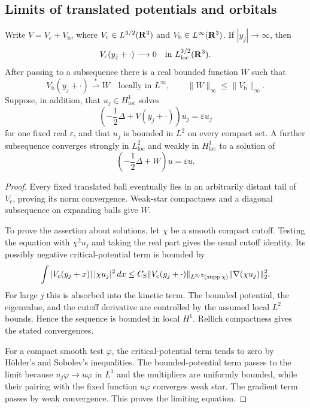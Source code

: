 \subsection{Limits of translated potentials and orbitals}

\begin{lemma}
\label{lem:translated-orbital-compactness}
Write \(V=V_{\mathrm c}+V_{\mathrm b}\), where
\(V_{\mathrm c}\in L^{3/2}(\mathbf R^3)\) and
\(V_{\mathrm b}\in L^\infty(\mathbf R^3)\).  If \(|y_j|\to\infty\), then
\[
 V_{\mathrm c}(y_j+\cdot)\longrightarrow0
 \quad\text{in }L^{3/2}_{\mathrm{loc}}(\mathbf R^3).
\]
After passing to a subsequence there is a real bounded function \(W\) such
that
\[
 V_{\mathrm b}(y_j+\cdot)\stackrel{*}{\rightharpoonup}W
 \quad\text{locally in }L^\infty,
 \qquad \|W\|_\infty\le\|V_{\mathrm b}\|_\infty.
\]
Suppose, in addition, that \(u_j\in H^1_{\mathrm{loc}}\) solves
\[
 \left(-\frac12\Delta+V(y_j+\cdot)\right)u_j=\varepsilon u_j
\]
for one fixed real \(\varepsilon\), and that \(u_j\) is bounded in
\(L^2\) on every compact set.  A further subsequence converges strongly
in \(L^2_{\mathrm{loc}}\) and weakly in \(H^1_{\mathrm{loc}}\) to a
solution of
\[
 \left(-\frac12\Delta+W\right)u=\varepsilon u.
\]
\end{lemma}

\begin{proof}
Every fixed translated ball eventually lies in an arbitrarily distant
tail of \(V_{\mathrm c}\), proving its norm convergence.  Weak-star
compactness and a diagonal subsequence on expanding balls give \(W\).

To prove the assertion about solutions, let \(\chi\) be a smooth compact
cutoff.  Testing the equation with \(\chi^2u_j\) and taking the real part
gives the usual cutoff identity.  Its possibly negative critical-potential
term is bounded by
\[
 \int |V_{\mathrm c}(y_j+x)|\,|\chi u_j|^2\,dx
 \le C_{\mathrm S}\|V_{\mathrm c}(y_j+\cdot)\|_{L^{3/2}(\operatorname{supp}\chi)}
          \|\nabla(\chi u_j)\|_2^2.
\]
For large \(j\) this is absorbed into the kinetic term.  The bounded
potential, the eigenvalue, and the cutoff derivative are controlled by
the assumed local \(L^2\) bounds.  Hence the sequence is bounded in local
\(H^1\).  Rellich compactness gives the stated convergences.

For a compact smooth test \(\varphi\), the critical-potential term tends
to zero by H\"older's and Sobolev's inequalities.  The bounded-potential
term passes to the limit because \(u_j\varphi\to u\varphi\) in \(L^1\)
and the multipliers are uniformly bounded, while their pairing with the
fixed function \(u\varphi\) converges weak star.  The gradient term passes
by weak convergence.  This proves the limiting equation.
\end{proof}

